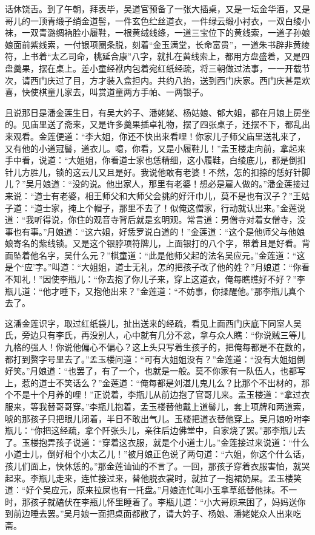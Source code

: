 话休饶舌。到了午朝，拜表毕，吴道官预备了一张大插桌，又是一坛金华酒，又是哥儿的一顶青缎子绡金道髻，一件玄色纻丝道衣，一件绿云缎小衬衣，一双白绫小袜，一双青潞绸衲脸小履鞋，一根黄绒线绦，一道三宝位下的黄线索，一道子孙娘娘面前紫线索，一付银项圈条脱，刻着“金玉满堂，长命富贵”，一道朱书辟非黄绫符，上书着“太乙司命，桃延合康”八字，就扎在黄线索上，都用方盘盛着，又是四盘羹果，摆在桌上。差小童经袱内包着宛红纸经疏，将三朝做过法事，一一开载节次，请西门庆过了目，方才装入盒担内。共约八抬，送到西门庆家。西门庆甚是欢喜，快使棋童儿家去，叫赏道童两方手帕、一两银子。

且说那日是潘金莲生日，有吴大妗子、潘姥姥、杨姑娘、郁大姐，都在月娘上房坐的。见庙里送了斋来，又是许多羹果插卓礼物，摆了四张桌子，还摆不下，都乱出来观看。金莲便道：“李大姐，你还不快出来看哩！你家儿子师父庙里送礼来了，又有他的小道冠髻，道衣儿。噫，你看，又是小履鞋儿！”孟玉楼走向前，拿起来手中看，说道：“大姐姐，你看道士家也恁精细，这小履鞋，白绫底儿，都是倒扣针儿方胜儿，锁的这云儿又且是好。我说他敢有老婆！不然，怎的扣捺的恁好针脚儿？”吴月娘道：“没的说。他出家人，那里有老婆！想必是雇人做的。”潘金莲接过来说：“道士有老婆，相王师父和大师父会挑的好汗巾儿，莫不是也有汉子？”王姑子道：“道士家，掩上个帽子，那里不去了！似俺这僧家，行动就认出来。”金莲说道：“我听得说，你住的观音寺背后就是玄明观。常言道：男僧寺对着女僧寺，没事也有事。”月娘道：“这六姐，好恁罗说白道的！”金莲道：“这个是他师父与他娘娘寄名的紫线锁。又是这个银脖项符牌儿，上面银打的八个字，带着且是好看。背面坠着他名字，吴什么元？”棋童道：“此是他师父起的法名吴应元。”金莲道：“这是个‘应’字。”叫道：“大姐姐，道士无礼，怎的把孩子改了他的姓？”月娘道：“你看不知礼！”因使李瓶儿：“你去抱了你儿子来，穿上这道衣，俺每瞧瞧好不好？”李瓶儿道：“他才睡下，又抱他出来？”金莲道：“不妨事，你揉醒他。”那李瓶儿真个去了。

这潘金莲识字，取过红纸袋儿，扯出送来的经疏，看见上面西门庆底下同室人吴氏，旁边只有李氏，再没别人，心中就有几分不忿，拿与众人瞧：“你说贼三等儿九格的强人！你说他偏心不偏心？这上头只写着生孩子的，把俺每都是不在数的，都打到赘字号里去了。”孟玉楼问道：“可有大姐姐没有？”金莲道：“没有大姐姐倒好笑。”月娘道：“也罢了，有了一个，也就是一般。莫不你家有一队伍人，也都写上，惹的道士不笑话么？”金莲道：“俺每都是刘湛儿鬼儿么？比那个不出材的，那个不是十个月养的哩！”正说着，李瓶儿从前边抱了官哥儿来。孟玉楼道：“拿过衣服来，等我替哥哥穿。”李瓶儿抱着，孟玉楼替他戴上道髻儿，套上项牌和两道索，唬的那孩子只把眼儿闭着，半日不敢出气儿。玉楼把道衣替他穿上。吴月娘吩咐李瓶儿：“你把这经疏，拿个阡张头儿，亲往后边佛堂中，自家烧了罢。”那李瓶儿去了。玉楼抱弄孩子说道：“穿着这衣服，就是个小道士儿。”金莲接过来说道：“什么小道士儿，倒好相个小太乙儿！”被月娘正色说了两句道：“六姐，你这个什么话，孩儿们面上，快休恁的。”那金莲讪讪的不言了。一回，那孩子穿着衣服害怕，就哭起来。李瓶儿走来，连忙接过来，替他脱衣裳时，就拉了一抱裙奶屎。孟玉楼笑道：“好个吴应元，原来拉屎也有一托盘。”月娘连忙叫小玉拿草纸替他抹。不一时，那孩子就磕伏在李瓶儿怀里睡着了。李瓶儿道：“小大哥原来困了，妈妈送你到前边睡去罢。”吴月娘一面把桌面都散了，请大妗子、杨娘、潘姥姥众人出来吃斋。

